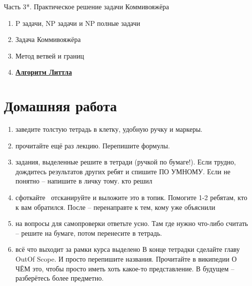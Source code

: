 \begin{frame}{Часть 3*. Практическое решение задачи Коммивояжёра}
	
	\begin{enumerate}
		\item P задачи, NP задачи и NP полные задачи
		\item Задача Коммивояжёра 
		\item Метод ветвей и границ
		\item \textbf{\href{https://habr.com/ru/articles/332208/}{Алгоритм Литтла}}
	\end{enumerate}
	

	
\end{frame}



\section{Домашняя работа}
\begin{frame}
	
	\small
	\begin{enumerate}
		\item заведите толстую тетрадь в клетку, удобную ручку и маркеры.
		\item прочитайте ещё раз лекцию. Перепишите формулы.
		\item задания, выделенные  решите в тетради (ручкой по бумаге!). Если трудно, дождитесь результатов других ребят и спишите ПО УМНОМУ. Если не понятно -- напишите в личку тому. кто решил
		\item сфоткайте \ отсканируйте и выложите это в топик. Помогите 1-2 ребятам, кто к вам обратился. После -- перенаправте к тем, кому уже объяснили
		\item на вопросы для самопроверки ответьте усно. Там где нужно что-либо считать -- решите на бумаге, потом перенесите в тетрадь.
		\item всё что выходит за рамки курса выделено  В конце тетрадки сделайте главу OutOf Scope. И просто перепишите названия. Прочитайте в википедии О ЧЁМ это, чтобы просто иметь хоть какое-то представление. В будущем -- разберётесь более предметно.
	\end{enumerate}
	
	
\end{frame}

